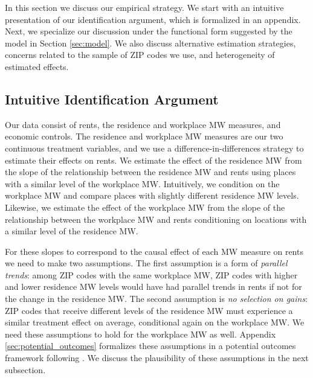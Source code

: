 
In this section we discuss our empirical strategy.
We start with an intuitive presentation of our identification argument, which
is formalized in an appendix.
Next, we specialize our discussion under the functional form suggested by
the model in Section \ref{sec:model}.
We also discuss alternative estimation strategies, concerns related to
the sample of ZIP codes we use, and heterogeneity of estimated effects.

\subsection{Intuitive Identification Argument}

Our data consist of rents, the residence and workplace MW measures, and 
economic controls.
The residence and workplace MW measures are our two continuous treatment 
variables, and we use a difference-in-differences strategy to estimate their 
effects on rents.
We estimate the effect of the residence MW from the slope of the relationship 
between the residence MW and rents using places with a similar level of the 
workplace MW.
Intuitively, we condition on the workplace MW and compare places with slightly
different residence MW levels.
Likewise, we estimate the effect of the workplace MW from the slope of the 
relationship between the workplace MW and rents conditioning on locations 
with a similar level of the residence MW.

For these slopes to correspond to the causal effect of each MW measure on rents 
we need to make two assumptions.
The first assumption is a form of \textit{parallel trends}: among ZIP codes with 
the same workplace MW, ZIP codes with higher and lower residence MW levels would 
have had parallel trends in rents if not for the change in the residence MW.
The second assumption is \textit{no selection on gains}: ZIP codes that receive
different levels of the residence MW must experience a similar treatment effect
on average, conditional again on the workplace MW.
We need these assumptions to hold for the workplace MW as well.
Appendix \ref{sec:potential_outcomes} formalizes these assumptions in a 
potential outcomes framework following \textcite{CallawayEtAl2021}.
We discuss the plausibility of these assumptions in the next subsection.

